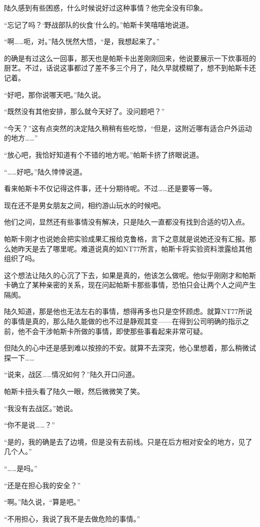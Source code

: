 陆久感到有些困惑，什么时候说好过这种事情？他完全没有印象。

“忘记了吗？‘野战部队的伙食’什么的。”帕斯卡笑嘻嘻地说道。

“啊……呃，对。”陆久恍然大悟，“是，我想起来了。”

的确是有过这么一回事，那天也是帕斯卡出差刚刚回来，他说要展示一下炊事班的厨艺。不过，话说这事都过了差不多三个月了，陆久早就模糊了，想不到帕斯卡还记着。

“好吧，那你说哪天吧。”陆久说。

“既然没有其他安排，那么就今天好了。没问题吧？”

“今天？”这有点突然的决定陆久稍稍有些吃惊，“但是，这附近哪有适合户外运动的地方……”

“放心吧，我恰好知道有个不错的地方呢。”帕斯卡挤了挤眼说道。

“……好吧。”陆久悻悻说道。

看来帕斯卡不仅记得这件事，还十分期待呢。不过……还是要等一等。

现在还不是男女朋友之间，相约游山玩水的时候吧。

他们之间，显然还有些事情没有解决，只是陆久一直都没有找到合适的切入点。

帕斯卡刚才也说她会把实验成果汇报给克鲁格，言下之意就是说她还没有汇报。那么她昨天是去了哪里呢。难道说真的如NT77所言，帕斯卡将实验资料泄露给其他组织了吗。

这个想法让陆久的心沉了下去，如果是真的，他该怎么做呢。他似乎刚刚才和帕斯卡确立了某种亲密的关系，现在问起帕斯卡那些事情，恐怕只会让两个人之间产生隔阂。

陆久知道，那是他也无法左右的事情，想得再多也只是空怀顾虑。就算NT77所说的事情是真的，那么陆久能做的也不过是静观其变——在得到公司明确的指示之前，他不会干涉帕斯卡所做的事情，即使那些事看起来非常可疑。

但陆久的心中还是感到难以按捺的不安。就算不去深究，他心里想着，那么稍微试探一下……

“说来，战区……情况如何？”陆久开口问道。

帕斯卡扭头看了陆久一眼，然后微微笑了笑。

“我没有去战区。”她说。

“你不是说……？”

“是的，我的确是去了边境，但是没有去前线。只是在后方相对安全的地方，见了几个人。”

“……是吗。”

“还是在担心我的安全？”

“啊。”陆久说，“算是吧。”

“不用担心，我说了我不是去做危险的事情。”

